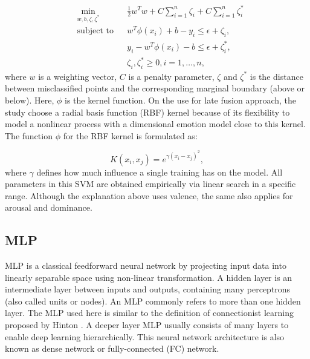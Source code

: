 \begin{equation}
\begin{aligned}
& \underset{w, b, \zeta, \zeta^*}{\text{min}}
& & \frac{1}{2} w^Tw + C \sum_{i=1}^n \zeta_i + C \sum_{i=1}^n \zeta_i^* \\
& \text{subject to}
& & w^T \phi (x_i)+b- y_i \leq \epsilon  + \zeta_i, \\
&&& y_i - w^T \phi (x_i) -b \leq \epsilon + \zeta_i^*, \\ 
&&& \zeta_i, \zeta_i^* \geq 0, i = 1, \ldots, n,
\end{aligned}
\end{equation}
where $w$ is a weighting vector, $C$ is a penalty parameter, $\zeta$ and
$\zeta^*$ is the distance between misclassified points and the corresponding
marginal boundary (above or below). Here, $\phi$ is the kernel function. On
the use for late fusion approach, the study choose a radial basis function
(RBF) kernel because of its flexibility to model a nonlinear process with a
dimensional emotion model close to this kernel. The function $\phi$ for the RBF
kernel is formulated as: 

\begin{equation}
 K(x_i, x_j) = e^{\gamma(x_i - x_j)^2},
 \label{tab:label}
\end{equation}
where $\gamma$ defines how much influence a single training has on the model.
All parameters in this SVM are obtained empirically via linear search in a
specific range. Although the explanation above uses valence, the same also
applies for arousal and dominance. 


\subsection{MLP}
MLP is a classical feedforward neural network by projecting input data into
linearly separable space using non-linear transformation. A hidden layer is an
intermediate layer between inputs and outputs, containing many perceptrons
(also called units or nodes). An MLP commonly refers to more than one hidden
layer. The MLP used here is similar to the definition of connectionist learning
proposed by Hinton \cite{Hinton1989}. A deeper layer MLP usually consists of
many layers to enable deep learning hierarchically. This neural network
architecture is also known as dense network or fully-connected (FC) network.
  
